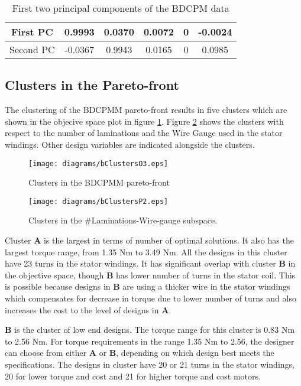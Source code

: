\begin{table}[!ht]
\centering
\begin{tabular}{|c|c|c|c|c|c|}
 \hline
 First PC & 0.9993 & 0.0370 & 0.0072 & 0 & -0.0024\\
 \hline
 Second PC & -0.0367 & 0.9943 & 0.0165 & 0 & 0.0985\\
 \hline
 \end{tabular}
\caption{First two principal components of the BDCPM data}
\label{firstTwoPCs}
\end{table}

\subsection{Clusters in the Pareto-front}
The clustering of the BDCPMM pareto-front results in five clusters 
which are shown in the objecive space plot in figure \ref{bClustersO}. 
Figure \ref{bClustersP} shows the clusters with respect to the number
of laminations and the Wire Gauge used in the stator windings. Other  
design variables are indicated alongside the clusters.


\begin{figure}[ht]\begin{center}
 \texttt{[image: diagrams/bClustersO3.eps]} 
 \caption{Clusters in the BDCPMM pareto-front}
 \label{bClustersO}
\end{center}\end{figure}


\begin{figure}[ht]\begin{center}
 \texttt{[image: diagrams/bClustersP2.eps]} 
 \caption{Clusters in the \#Laminations-Wire-gauge subspace.}
 \label{bClustersP}
\end{center}\end{figure}


Cluster \textbf{A} is the largest in terms of number of optimal 
solutions. It also has the largest torque range, from 1.35 Nm to 3.49
Nm. All the designs in this cluster have 23 turns in the stator 
windings. It  has significant overlap with cluster \textbf{B} in the 
objective space, though \textbf{B} has lower number of turns in the 
stator coil. This is possible because designs in \textbf{B} are using
a thicker wire in the stator windings which compensates for decrease 
in torque due to lower number of turns and also increases the cost to 
the level of designs in \textbf{A}.

\textbf{B} is the cluster of low end designs. The torque range for 
this cluster is 0.83 Nm to 2.56 Nm. For torque requirements in the 
range 1.35 Nm to 2.56, the designer can choose from either \textbf{A}
or \textbf{B}, depending on which design best meets the 
specifications. The designs in cluster have 20 or 21 turns in the 
stator windings, 20 for lower torque and cost and 21 for higher torque
and cost motors. 

